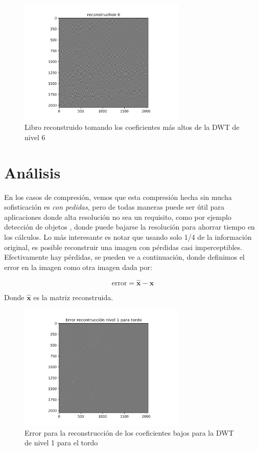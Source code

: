 \documentclass[conference]{IEEEtran}
\begin{document}
\begin{figure}[H]
\includegraphics[width=8cm]{images/book_r_h_6.png}
\caption{Libro reconstruido tomando los coeficientes más altos de la DWT de nivel 6}
\end{figure}






\section{Análisis}

En los casos de compresión, vemos que esta compresión hecha sin mucha sofisticación es \emph{con pedidas}, pero de todas maneras puede ser útil para aplicaciones donde alta resolución no sea un requisito, como por ejemplo detección de objetos \cite{pedestrian}, donde puede bajarse la resolución para ahorrar tiempo en los cálculos. Lo más interesante es notar que usando solo 1/4 de la información original, es posible reconstruir una imagen con pérdidas casi imperceptibles. Efectivamente hay pérdidas, se pueden ve a continuación, donde definimos el error en la imagen como otra imagen dada por:


\begin{equation}
  \text{error} = \hat{\pmb{x}}-\pmb{x}
\end{equation}

Donde $\hat{\pmb{x}}$ es la matriz reconstruida.



\begin{figure}[H]
\includegraphics[width=8cm]{images/error_tordo_r_1.png}
\caption{Error para la reconstrucción de los coeficientes bajos para la DWT de nivel 1 para el tordo}
\end{figure}
\end{document}
